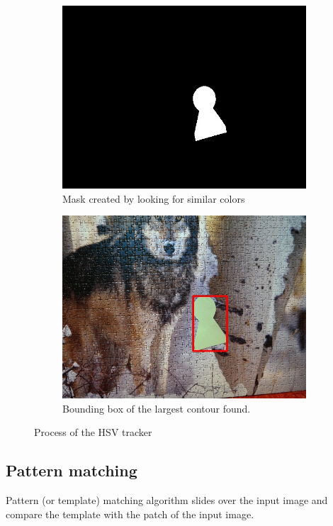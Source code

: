 \begin{figure}
\begin{subfigure}[b]{0.48\linewidth}
    \includegraphics[width=\linewidth]{img/hsv/mask.jpg}
    \caption{Mask created by looking for similar colors}
  \end{subfigure}
  \begin{subfigure}[b]{0.48\linewidth}
    \includegraphics[width=\linewidth]{img/hsv/result.jpg}
    \caption{Bounding box of the largest contour found.}
  \end{subfigure}
  \caption{Process of the HSV tracker}
  \label{fig:hsv-tracker}
\end{figure}

\subsection {Pattern matching}
Pattern (or template) matching algorithm slides over the input image and
compare the template with the patch of the input image.


